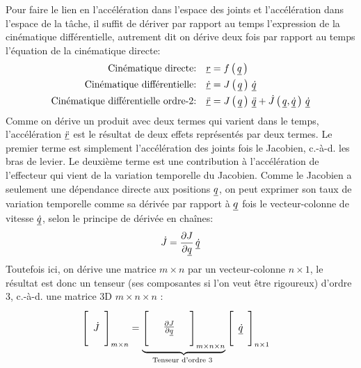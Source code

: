 Pour faire le lien en l'accélération dans l'espace des joints et l'accélération dans l'espace de la tâche, il suffit de dériver par rapport au temps l'expression de la cinématique différentielle, autrement dit on dérive deux fois par rapport au temps l'équation de la cinématique directe:
\begin{align}
	\text{Cinématique directe:}  \quad \underline{r} &= f\left( \, \underline{q} \, \right) \\
	\text{Cinématique différentielle:} \quad \underline{\dot{r}} &= J\left( \, \underline{q} \, \right) \, \underline{\dot{q}} \\
	\text{Cinématique différentielle ordre-2:} \quad \underline{\ddot{r}} &= J\left( \, \underline{q} \, \right) \, \underline{\ddot{q}}  + \dot{J} \left( \, \underline{q}  , \underline{\dot{q}} \, \right) \, \underline{\dot{q}}
	\label{eq:ddj}
\end{align}
Comme on dérive un produit avec deux termes qui varient dans le temps, l'accélération $\underline{\ddot{r}}$ est le résultat de deux effets représentés par deux termes. Le premier terme est simplement l'accélération des joints fois le Jacobien, c.-à-d. les bras de levier. Le deuxième terme est une contribution à l'accélération de l'effecteur qui vient de la variation temporelle du Jacobien. Comme le Jacobien a seulement une dépendance directe aux positions $\underline{q}$, on peut exprimer son taux de variation temporelle comme sa dérivée par rapport à $\underline{q}$ fois le vecteur-colonne de vitesse $\underline{\dot{q}}$, selon le principe de dérivée en chaînes:
\begin{align}
	\dot{J} = \frac{ \partial J}{\partial \underline{q}} \, \underline{\dot{q}}
\end{align}
Toutefois ici, on dérive une matrice $m \times n$ par un vecteur-colonne $n \times 1$, le résultat est donc un tenseur (ses composantes si l'on veut être rigoureux) d'ordre 3, c.-à-d. une matrice 3D $m \times n \times n$ :
\begin{align}
	\left[ \begin{array}{c}  \\ \dot{J} \\ \\
	\end{array} \right]_{m \times n}
	&=
	\underbrace{
		\left[ \begin{array}{c c c}
				   &&\\
				   & \frac{ \partial J}{\partial \underline{q}} &\\
				   &&
		\end{array} \right]_{m \times n \times n}}_{\text{Tenseur d'ordre 3
	}}
	\left[ \begin{array}{c}
			   \\ \underline{\dot{q}} \\ \\
	\end{array} \right]_{n \times 1}
	\label{eq:jdot}
\end{align}
